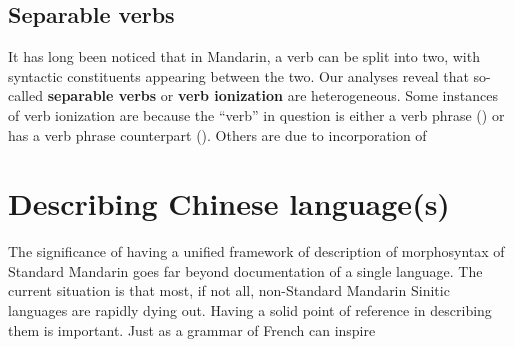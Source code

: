 \documentclass[UTF8, a4paper, oneside, scheme=plain, 12pt]{ctexrep}
\newcommand*{\concept}[1]{\textbf{#1}}
\begin{document}
\subsection{Separable verbs}

It has long been noticed that in Mandarin,
a verb can be split into two, with syntactic constituents appearing between the two.
Our analyses reveal that so-called \concept{separable verbs} or \concept{verb ionization} are heterogeneous.
Some instances of verb ionization are because the ``verb'' in question
is either a verb phrase () or has a verb phrase counterpart ().
Others are due to incorporation of 

\section{Describing Chinese language(s)}

The significance of having a unified framework of description of morphosyntax of Standard Mandarin
goes far beyond documentation of a single language.
The current situation is that most, if not all, non-Standard Mandarin Sinitic languages
are rapidly dying out.
Having a solid point of reference in describing them is important.
Just as a grammar of French can inspire 

\printbibliography
\end{document}
